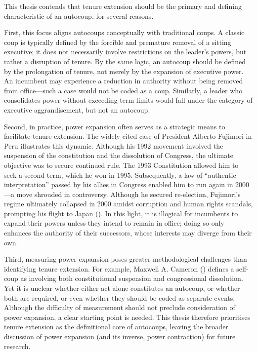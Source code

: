 \documentclass[
  12pt,
]{report}
\begin{document}
This thesis contends that tenure extension should be the primary and
defining characteristic of an autocoup, for several reasons.

First, this focus aligns autocoups conceptually with traditional coups.
A classic coup is typically defined by the forcible and premature
removal of a sitting executive; it does not necessarily involve
restrictions on the leader's powers, but rather a disruption of tenure.
By the same logic, an autocoup should be defined by the prolongation of
tenure, not merely by the expansion of executive power. An incumbent may
experience a reduction in authority without being removed from
office---such a case would not be coded as a coup. Similarly, a leader
who consolidates power without exceeding term limits would fall under
the category of executive aggrandisement, but not an autocoup.

Second, in practice, power expansion often serves as a strategic means
to facilitate tenure extension. The widely cited case of President
Alberto Fujimori in Peru illustrates this dynamic. Although his 1992
movement involved the suspension of the constitution and the dissolution
of Congress, the ultimate objective was to secure continued rule. The
1993 Constitution allowed him to seek a second term, which he won in
1995. Subsequently, a law of ``authentic interpretation'' passed by his
allies in Congress enabled him to run again in 2000---a move shrouded in
controversy. Although he secured re-election, Fujimori's regime
ultimately collapsed in 2000 amidst corruption and human rights
scandals, prompting his flight to Japan (). In this light, it is illogical for incumbents to expand their
powers unless they intend to remain in office; doing so only enhances
the authority of their successors, whose interests may diverge from
their own.

Third, measuring power expansion poses greater methodological challenges
than identifying tenure extension. For example, Maxwell A. Cameron
() defines a self-coup as involving
both constitutional suspension and congressional dissolution. Yet it is
unclear whether either act alone constitutes an autocoup, or whether
both are required, or even whether they should be coded as separate
events. Although the difficulty of measurement should not preclude
consideration of power expansion, a clear starting point is needed. This
thesis therefore prioritises tenure extension as the definitional core
of autocoups, leaving the broader discussion of power expansion (and its
inverse, power contraction) for future research.
\end{document}
